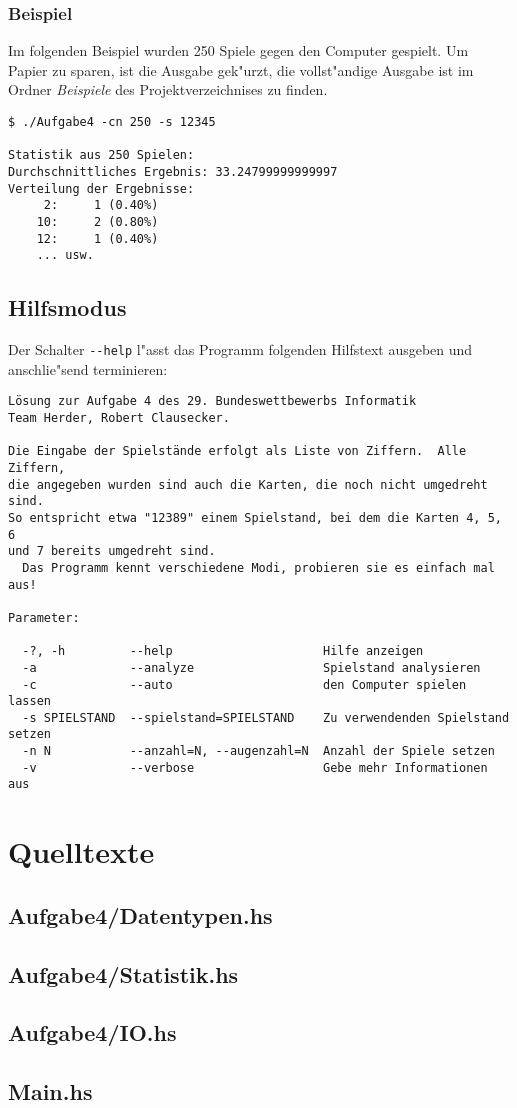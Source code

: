 \documentclass{scrreprt}
\begin{document}
\subsection*{Beispiel}
Im folgenden Beispiel wurden 250 Spiele gegen den Computer gespielt.  Um Papier
zu sparen, ist die Ausgabe gek"urzt, die vollst"andige Ausgabe ist im Ordner
\emph{Beispiele} des Projektverzeichnises zu finden.

\begin{verbatim}
$ ./Aufgabe4 -cn 250 -s 12345

Statistik aus 250 Spielen:
Durchschnittliches Ergebnis: 33.24799999999997
Verteilung der Ergebnisse:
	 2:     1 (0.40%)
	10:     2 (0.80%)
	12:     1 (0.40%)
    ... usw.
\end{verbatim}

\section{Hilfsmodus}
Der Schalter \texttt{-\/-help} l"asst das Programm folgenden Hilfstext ausgeben
und anschlie"send terminieren:

\begin{verbatim}
Lösung zur Aufgabe 4 des 29. Bundeswettbewerbs Informatik
Team Herder, Robert Clausecker.

Die Eingabe der Spielstände erfolgt als Liste von Ziffern.  Alle Ziffern,
die angegeben wurden sind auch die Karten, die noch nicht umgedreht sind.
So entspricht etwa "12389" einem Spielstand, bei dem die Karten 4, 5, 6
und 7 bereits umgedreht sind.
  Das Programm kennt verschiedene Modi, probieren sie es einfach mal aus!

Parameter:

  -?, -h         --help                     Hilfe anzeigen
  -a             --analyze                  Spielstand analysieren
  -c             --auto                     den Computer spielen lassen
  -s SPIELSTAND  --spielstand=SPIELSTAND    Zu verwendenden Spielstand setzen
  -n N           --anzahl=N, --augenzahl=N  Anzahl der Spiele setzen
  -v             --verbose                  Gebe mehr Informationen aus
\end{verbatim}

\chapter{Quelltexte}

\section{Aufgabe4/Datentypen.hs}


\section{Aufgabe4/Statistik.hs}


\section{Aufgabe4/IO.hs}


\section{Main.hs}

\end{document}
